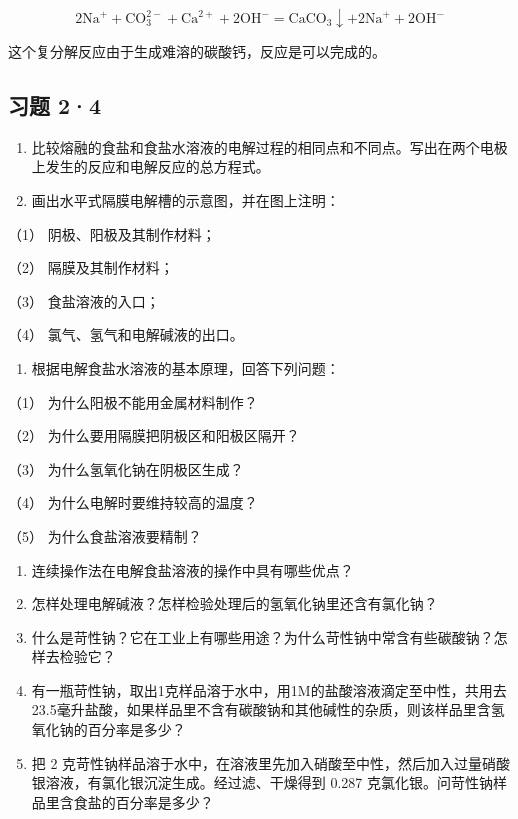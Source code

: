 \[
2 \mathrm{Na} ^ {+} + \mathrm{CO} _ {3}^{2-} + \mathrm{Ca} ^{2+} + 2 \mathrm{OH} ^ {-} = \mathrm{CaCO} _ {3} \downarrow + 2 \mathrm{Na} ^ {+} + 2 \mathrm{OH} ^ {-}
\]

这个复分解反应由于生成难溶的碳酸钙，反应是可以完成的。

\subsection{习题 2·4}

\begin{enumerate}
\item
  比较熔融的食盐和食盐水溶液的电解过程的相同点和不同点。写出在两个电极上发生的反应和电解反应的总方程式。
\item
  画出水平式隔膜电解槽的示意图，并在图上注明：
\end{enumerate}

（1） 阴极、阳极及其制作材料；

（2） 隔膜及其制作材料；

（3） 食盐溶液的入口；

（4） 氯气、氢气和电解碱液的出口。

\begin{enumerate}[start=3]
\item
  根据电解食盐水溶液的基本原理，回答下列问题：
\end{enumerate}

（1） 为什么阳极不能用金属材料制作？

（2） 为什么要用隔膜把阴极区和阳极区隔开？

（3） 为什么氢氧化钠在阴极区生成？

（4） 为什么电解时要维持较高的温度？

（5） 为什么食盐溶液要精制？

\begin{enumerate}[start=4]
\item
  连续操作法在电解食盐溶液的操作中具有哪些优点？
\item
  怎样处理电解碱液？怎样检验处理后的氢氧化钠里还含有氯化钠？
\item
  什么是苛性钠？它在工业上有哪些用途？为什么苛性钠中常含有些碳酸钠？怎样去检验它？
\item
  有一瓶苛性钠，取出1克样品溶于水中，用1M的盐酸溶液滴定至中性，共用去23.5毫升盐酸，如果样品里不含有碳酸钠和其他碱性的杂质，则该样品里含氢氧化钠的百分率是多少？
\item
  把 2
  克苛性钠样品溶于水中，在溶液里先加入硝酸至中性，然后加入过量硝酸银溶液，有氯化银沉淀生成。经过滤、干燥得到
  0.287 克氯化银。问苛性钠样品里含食盐的百分率是多少？
\end{enumerate}

